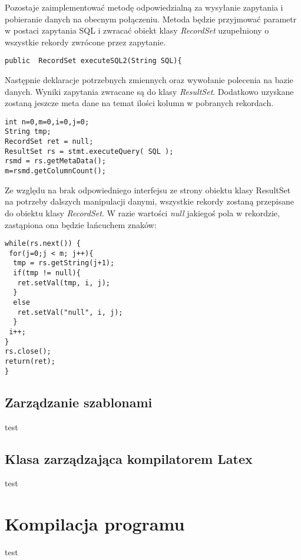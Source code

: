 Pozostaje zaimplementować metodę odpowiedzialną za wysyłanie zapytania i pobieranie danych na obecnym połączeniu. Metoda będzie przyjmować parametr w postaci zapytania SQL i zwracać obiekt klasy \emph{RecordSet} uzupełniony o wszystkie rekordy zwrócone przez zapytanie.
\begin{lstlisting}
public  RecordSet executeSQL2(String SQL){
\end{lstlisting}

Następnie deklaracje potrzebnych zmiennych oraz wywołanie polecenia na bazie danych. Wyniki zapytania zwracane są do klasy \emph{ResultSet}. Dodatkowo uzyskane zostaną jeszcze meta dane na temat ilości kolumn w pobranych rekordach. 
\begin{lstlisting}
int n=0,m=0,i=0,j=0;
String tmp;
RecordSet ret = null;
ResultSet rs = stmt.executeQuery( SQL );
rsmd = rs.getMetaData();
m=rsmd.getColumnCount();
\end{lstlisting}

Ze względu na brak odpowiedniego interfejsu ze strony obiektu klasy ResultSet na potrzeby dalszych manipulacji danymi, wszystkie rekordy zostaną przepisane do obiektu klasy \emph{RecordSet}. W razie wartości  \emph{null} jakiegoś pola w rekordzie, zastąpiona ona będzie łańcuchem znaków:
\begin{lstlisting}
while(rs.next()) {
 for(j=0;j < m; j++){
  tmp = rs.getString(j+1);
  if(tmp != null){
   ret.setVal(tmp, i, j);
  }
  else
   ret.setVal("null", i, j);
  }
 i++;
}   
rs.close();
return(ret);
}
\end{lstlisting}





\subsection{Zarządzanie szablonami}
test
\subsection{Klasa zarządzająca kompilatorem Latex}
test
\section{ Kompilacja programu}
test